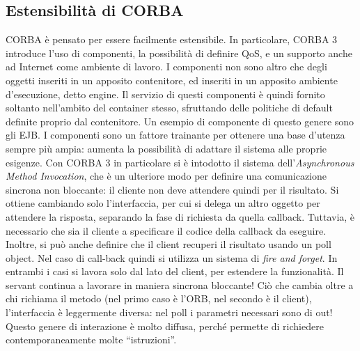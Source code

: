 \subsection{Estensibilità di CORBA}
CORBA è pensato per essere facilmente estensibile. In particolare, CORBA 3 introduce l'uso di componenti, la possibilità 
di definire QoS, e un supporto anche ad Internet come ambiente di lavoro.
I componenti non sono altro che degli oggetti inseriti in un apposito contenitore, ed inseriti in un apposito ambiente
d'esecuzione, detto engine. Il servizio di questi componenti è quindi fornito soltanto nell'ambito del container stesso,
sfruttando delle politiche di default definite proprio dal contenitore. Un esempio di componente di questo genere sono 
gli EJB.
I componenti sono un fattore trainante per ottenere una base d'utenza sempre più ampia: aumenta la possibilità di
adattare il sistema alle proprie esigenze.
Con CORBA 3 in particolare si è intodotto il sistema dell'\textit{Asynchronous Method Invocation}, che è un ulteriore 
modo per definire una comunicazione sincrona non bloccante: il cliente non deve attendere quindi per il risultato.
Si ottiene cambiando solo l'interfaccia, per cui si delega un altro oggetto per attendere la risposta, separando la fase 
di richiesta da quella callback. Tuttavia, è necessario che sia il cliente a specificare il codice della callback da 
eseguire.
Inoltre, si può anche definire che il client recuperi il risultato usando un poll object. Nel caso di call-back quindi 
si utilizza un sistema di \textit{fire and forget}. In entrambi i casi si lavora solo dal lato del client, per estendere 
la funzionalità.
Il servant continua a lavorare in maniera sincrona bloccante! Ciò che cambia oltre a chi richiama il metodo (nel primo 
caso è l'ORB, nel secondo è il client), l'interfaccia è leggermente diversa: nel poll i parametri necessari sono di out!
Questo genere di interazione è molto diffusa, perché permette di richiedere contemporaneamente molte ``istruzioni''.
